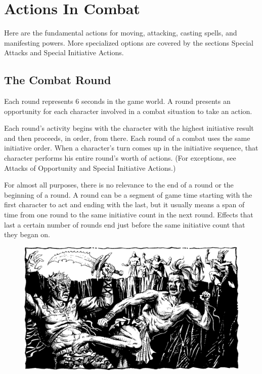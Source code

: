 \section{Actions In Combat}
Here are the fundamental actions for moving, attacking, casting spells, and manifesting powers. More specialized options are covered by the sections Special Attacks and Special Initiative Actions.

\subsection{The Combat Round}
Each round represents 6 seconds in the game world. A round presents an opportunity for each character involved in a combat situation to take an action.

Each round's activity begins with the character with the highest initiative result and then proceeds, in order, from there. Each round of a combat uses the same initiative order. When a character's turn comes up in the initiative sequence, that character performs his entire round's worth of actions. (For exceptions, see Attacks of Opportunity and Special Initiative Actions.)

For almost all purposes, there is no relevance to the end of a round or the beginning of a round. A round can be a segment of game time starting with the first character to act and ending with the last, but it usually means a span of time from one round to the same initiative count in the next round. Effects that last a certain number of rounds end just before the same initiative count that they began on.



\begin{figure}[t!]
\centering
\includegraphics[width=\textwidth]{images/monk-1.png}
\WOTC
\end{figure}





